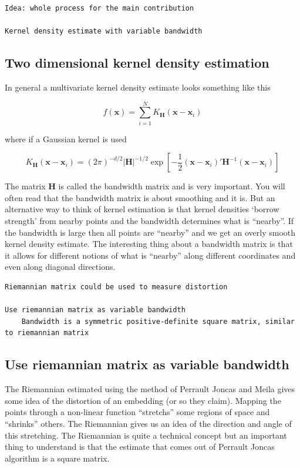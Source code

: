 \documentclass[11pt,a4paper,]{article}
\begin{document}
\begin{verbatim}
Idea: whole process for the main contribution

Kernel density estimate with variable bandwidth
\end{verbatim}

\hypertarget{two-dimensional-kernel-density-estimation}{%
\subsection{Two dimensional kernel density estimation}\label{two-dimensional-kernel-density-estimation}}

In general a multivariate kernel density estimate looks something like this

\[
\hat{f}(\mathbf{x})=\sum\limits_{i=1}^N K_{\mathbf{H}}(\mathbf{x}-\mathbf{x}_i)
\]

where if a Gaussian kernel is used

\[
K_{\mathbf{H}}(\mathbf{x}-\mathbf{x}_i)=(2\pi)^{-d/2}|\mathbf{H}|^{-1/2}\exp\left[-\frac{1}{2}(\mathbf{x}-\mathbf{x}_i)'\mathbf{H}^{-1}(\mathbf{x}-\mathbf{x}_i)\right]
\]

The matrix \(\mathbf{H}\) is called the bandwidth matrix and is very important. You will often read that the bandwidth matrix is about smoothing and it is. But an alternative way to think of kernel estimation is that kernel densities `borrow strength' from nearby points and the bandwidth determines what is ``nearby''. If the bandwidth is large then all points are ``nearby'' and we get an overly smooth kernel density estimate. The interesting thing about a bandwidth matrix is that it allows for different notions of what is ``nearby'' along different coordinates and even along diagonal directions.

\begin{verbatim}
Riemannian matrix could be used to measure distortion

Use riemannian matrix as variable bandwidth
    Bandwidth is a symmetric positive-definite square matrix, similar to riemannian matrix
\end{verbatim}

\hypertarget{use-riemannian-matrix-as-variable-bandwidth}{%
\subsection{Use riemannian matrix as variable bandwidth}\label{use-riemannian-matrix-as-variable-bandwidth}}

The Riemannian estimated using the method of Perrault Joncas and Meila gives some idea of the distortion of an embedding (or so they claim). Mapping the points through a non-linear function ``stretchs'' some regions of space and ``shrinks'' others. The Riemannian gives us an idea of the direction and angle of this stretching. The Riemannian is quite a technical concept but an important thing to understand is that the estimate that comes out of Perrault Joncas algorithm is a square matrix.
\end{document}
